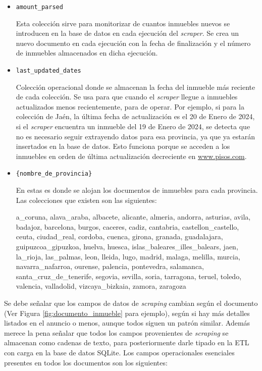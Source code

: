 \begin{itemize}
	\item \texttt{amount\_parsed}

    Esta colección sirve para monitorizar de cuantos inmuebles nuevos se introducen en la base de datos en cada ejecución del \textit{scraper}. Se crea un nuevo documento en cada ejecución con la fecha de finalización y el número de inmuebles almacenados en dicha ejecución.

	\item \texttt{last\_updated\_dates}

    Colección operacional donde se almacenan la fecha del inmueble más reciente de cada colección. Se usa para que cuando el \textit{scraper} llegue a inmuebles actualizados menos recientemente, para de operar. Por ejemplo, si para la colección de Jaén, la última fecha de actualización es el 20 de Enero de 2024, si el \textit{scraper} encuentra un inmueble del 19 de Enero de 2024, se detecta que no es necesario seguir extrayendo datos para esa provincia, ya que ya estarán insertados en la base de datos. Esto funciona porque se acceden a los inmuebles en orden de última actualización decreciente en \url{www.pisos.com}.


	\item \texttt{\{nombre\_de\_provincia\}}
 
    En estas es donde se alojan los documentos de inmuebles para cada provincia. Las colecciones que existen son las siguientes:

      a\_coruna, alava\_araba, albacete, alicante, almeria, andorra, asturias, avila, badajoz,
  barcelona, burgos, caceres, cadiz, cantabria, castellon\_castello, ceuta, ciudad\_real,
  cordoba, cuenca, girona, granada, guadalajara, guipuzcoa\_gipuzkoa, 
  huelva, huesca, islas\_baleares\_illes\_balears, jaen, la\_rioja, las\_palmas, leon, lleida, lugo, madrid,
  malaga, melilla, murcia, navarra\_nafarroa, ourense, palencia, pontevedra, salamanca,
  santa\_cruz\_de\_tenerife, segovia, sevilla, soria, tarragona, teruel, toledo, valencia,
  valladolid, vizcaya\_bizkaia, zamora, zaragoza

\end{itemize}



Se debe señalar que los campos de datos de \textit{scraping} cambian según el documento (Ver Figura \ref{fig:documento_inmueble} para ejemplo), según si hay más detalles listados en el anuncio o menos, aunque todos siguen un patrón similar. Además merece la pena señalar que todos los campos provenientes de \textit{scraping} se almacenan como cadenas de texto, para posteriormente darle tipado en la ETL con carga en la base de datos SQLite. Los campos operacionales esenciales presentes en todos los documentos son los siguientes:

